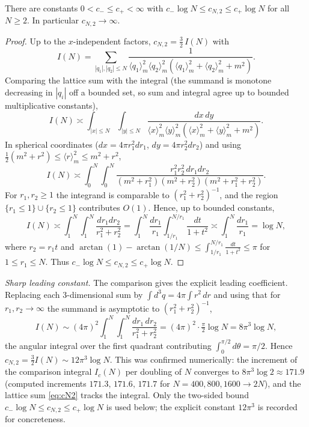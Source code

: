 \begin{qonelemma}\label{lem:logdiv}
There are constants $0<c_-\le c_+<\infty$ with $c_-\log N\le c_{N,2}\le c_+\log N$ for
all $N\ge2$. In particular $c_{N,2}\to\infty$.
\end{qonelemma}
\begin{proof}
Up to the $x$-independent factors, $c_{N,2}=\tfrac32\,I(N)$ with
\[
I(N)=\sum_{|q_1|,|q_2|\le N}\frac{1}{\langle q_1\rangle_m^2\langle q_2\rangle_m^2(\langle q_1\rangle_m^2+\langle q_2\rangle_m^2+m^2)} .
\]
Comparing the lattice sum with the integral (the summand is monotone decreasing in
$|q_i|$ off a bounded set, so sum and integral agree up to bounded multiplicative
constants),
\[
I(N)\asymp\int_{|x|\le N}\!\!\int_{|y|\le N}\frac{dx\,dy}{\langle x\rangle_m^2\langle y\rangle_m^2(\langle x\rangle_m^2+\langle y\rangle_m^2+m^2)} .
\]
In spherical coordinates ($dx=4\pi r_1^2dr_1$, $dy=4\pi r_2^2dr_2$) and using
$\tfrac12(m^2+r^2)\le\langle r\rangle_m^2\le m^2+r^2$,
\[
I(N)\asymp\int_0^N\!\!\int_0^N\frac{r_1^2r_2^2\,dr_1dr_2}{(m^2+r_1^2)(m^2+r_2^2)(m^2+r_1^2+r_2^2)} .
\]
For $r_1,r_2\ge1$ the integrand is comparable to $(r_1^2+r_2^2)^{-1}$, and the region
$\{r_1\le1\}\cup\{r_2\le1\}$ contributes $O(1)$. Hence, up to bounded constants,
\[
I(N)\asymp\int_1^N\!\!\int_1^N\frac{dr_1dr_2}{r_1^2+r_2^2}
=\int_1^N\frac{dr_1}{r_1}\int_{1/r_1}^{N/r_1}\frac{dt}{1+t^2}\asymp\int_1^N\frac{dr_1}{r_1}=\log N,
\]
where $r_2=r_1t$ and $\arctan(1)-\arctan(1/N)\le\int_{1/r_1}^{N/r_1}\frac{dt}{1+t^2}\le\pi$
for $1\le r_1\le N$. Thus $c_-\log N\le c_{N,2}\le c_+\log N$.
\end{proof}

\noindent\emph{Sharp leading constant.} The comparison gives the explicit leading
coefficient. Replacing each $3$-dimensional sum by $\int d^3q=4\pi\int r^2\,dr$ and using
that for $r_1,r_2\to\infty$ the summand is asymptotic to $(r_1^2+r_2^2)^{-1}$,
\[
I(N)\sim(4\pi)^2\!\int_1^N\!\!\int_1^N\frac{dr_1\,dr_2}{r_1^2+r_2^2}
=(4\pi)^2\cdot\tfrac{\pi}{2}\log N=8\pi^3\log N,
\]
the angular integral over the first quadrant contributing $\int_0^{\pi/2}d\theta=\pi/2$.
Hence $c_{N,2}=\tfrac32 I(N)\sim 12\pi^3\log N$. This was confirmed numerically: the
increment of the comparison integral $I_c(N)$ per doubling of $N$ converges to
$8\pi^3\log 2\approx171.9$ (computed increments $171.3,\,171.6,\,171.7$ for
$N=400,800,1600\to2N$), and the lattice sum \eqref{eq:cN2} tracks the integral. Only the
two-sided bound $c_-\log N\le c_{N,2}\le c_+\log N$ is used below; the explicit constant
$12\pi^3$ is recorded for concreteness.

